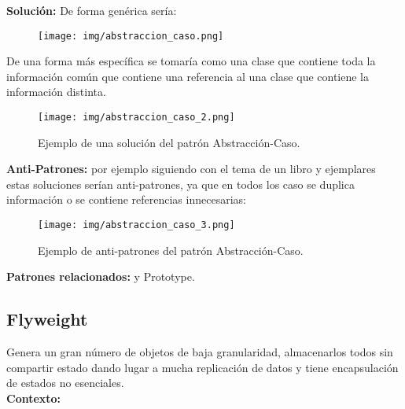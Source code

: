 \documentclass[10pt,a4paper,titlepage]{article}
\begin{document}
\textbf{Solución:} De forma genérica sería:
\begin{figure}[H] %
\centering
\texttt{[image: img/abstraccion\_caso.png]}
\end{figure}

De una forma más específica se tomaría como una clase que contiene toda la información común que contiene una referencia al una clase que contiene la información distinta.

\begin{figure}[H] %
\centering
\texttt{[image: img/abstraccion\_caso\_2.png]}
\caption{Ejemplo de una solución del patrón Abstracción-Caso.}
\end{figure}

\textbf{Anti-Patrones:} por ejemplo siguiendo con el tema de un libro y ejemplares estas soluciones serían anti-patrones, ya que en todos los caso se duplica información o se contiene referencias innecesarias:
\begin{figure}[H] %
\centering
\texttt{[image: img/abstraccion\_caso\_3.png]}
\caption{Ejemplo de anti-patrones del patrón Abstracción-Caso.}
\end{figure}

\textbf{Patrones relacionados:}  y Prototype.

\subsection{Flyweight}\label{Flyweight}
Genera un gran número de objetos de baja granularidad, almacenarlos todos sin compartir estado dando lugar a mucha replicación de datos y tiene encapsulación de estados no esenciales.\\

\textbf{Contexto:}
\end{document}
